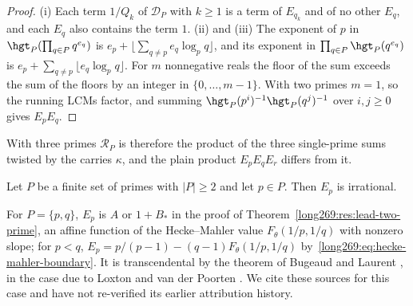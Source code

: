 \begin{proof}
(i) Each term $1/Q_k$ of $\mathcal D_P$ with $k\ge1$ is a term of $E_{q_k}$
and of no other $E_q$, and each $E_q$ also contains the term $1$.
(ii) and (iii) The exponent of $p$ in $\hgt_P(\prod_{q\in P}q^{e_q})$ is
$e_p+\lfloor\sum_{q\ne p}e_q\log_pq\rfloor$, and its exponent in
$\prod_{q\in P}\hgt_P(q^{e_q})$ is $e_p+\sum_{q\ne p}\lfloor e_q\log_pq\rfloor$.
For $m$ nonnegative reals the floor of the sum exceeds the sum of the floors
by an integer in $\{0,\ldots,m-1\}$.  With two primes $m=1$, so the running LCMs
factor, and summing $\hgt_P(p^i)^{-1}\hgt_P(q^j)^{-1}$ over $i,j\ge0$ gives
$E_pE_q$.
\end{proof}

With three primes $\mathcal R_P$ is therefore the product of the three
single-prime sums twisted by the carries $\kappa$, and the plain product
$E_pE_qE_r$ differs from it.

\begin{remark}\label{long269:res:single-prime-subsums}
Let $P$ be a finite set of primes with $|P|\ge2$ and let $p\in P$.  Then
$E_p$ is irrational.
\end{remark}


For $P=\{p,q\}$, $E_p$ is $A$ or $1+B_\ast$ in the proof of
Theorem~\ref{long269:res:lead-two-prime}, an affine function of the
Hecke--Mahler value $F_\theta(1/p,1/q)$ with nonzero slope; for $p<q$,
$E_p=p/(p-1)-(q-1)F_\theta(1/p,1/q)$ by~\eqref{long269:eq:hecke-mahler-boundary}.
It is transcendental by the theorem of Bugeaud and Laurent
\cite[Theorem~1.1]{bugeaudlaurent2023}, in the case due to Loxton and van der
Poorten \cite[Theorem~8, p.~40]{loxtonvdp1977}.  We cite these sources for
this case and have not re-verified its earlier attribution history.

